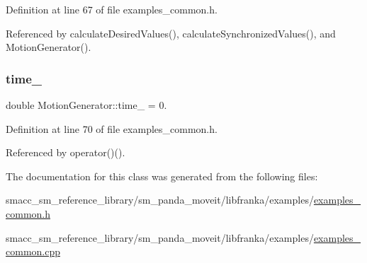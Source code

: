 Definition at line 67 of file examples\+\_\+common.\+h.



Referenced by calculate\+Desired\+Values(), calculate\+Synchronized\+Values(), and Motion\+Generator().

\mbox{\label{classMotionGenerator_a42b90532e4f257bb592b3c2a8e8e370f}} 
\subsubsection{\texorpdfstring{time\+\_\+}{time\_}}
{\footnotesize\ttfamily double Motion\+Generator\+::time\+\_\+ = 0.\hspace{0.3cm}{\ttfamily [private]}}



Definition at line 70 of file examples\+\_\+common.\+h.



Referenced by operator()().



The documentation for this class was generated from the following files\+:\begin{DoxyCompactItemize}
\item 
smacc\+\_\+sm\+\_\+reference\+\_\+library/sm\+\_\+panda\+\_\+moveit/libfranka/examples/\hyperlink{examples__common_8h}{examples\+\_\+common.\+h}\item 
smacc\+\_\+sm\+\_\+reference\+\_\+library/sm\+\_\+panda\+\_\+moveit/libfranka/examples/\hyperlink{examples__common_8cpp}{examples\+\_\+common.\+cpp}\end{DoxyCompactItemize}
